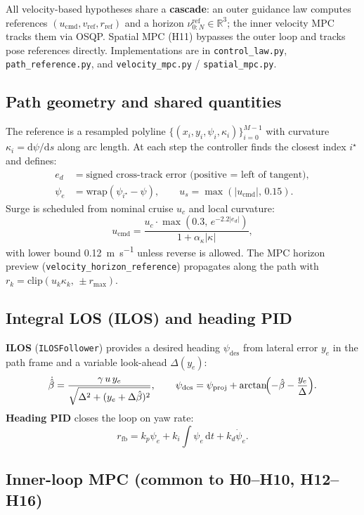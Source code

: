 \documentclass[11pt,a4paper]{article}
\begin{document}
All velocity-based hypotheses share a \textbf{cascade}: an outer guidance law computes
references $(u_{\mathrm{cmd}}, v_{\mathrm{ref}}, r_{\mathrm{ref}})$ and a horizon
$\nu^{\mathrm{ref}}_{0:N} \in \mathbb{R}^{3}$; the inner velocity MPC tracks them via OSQP.
Spatial MPC (H11) bypasses the outer loop and tracks pose references directly.
Implementations are in \texttt{control\_law.py}, \texttt{path\_reference.py}, and
\texttt{velocity\_mpc.py} / \texttt{spatial\_mpc.py}.

\subsection{Path geometry and shared quantities}

The reference is a resampled polyline $\{(x_i,y_i,\psi_i,\kappa_i)\}_{i=0}^{M-1}$ with
curvature $\kappa_i = \mathrm{d}\psi/\mathrm{d}s$ along arc length.
At each step the controller finds the closest index $i^\star$ and defines:
\begin{align}
  e_d &= \text{signed cross-track error (positive = left of tangent)}, \\
  \psi_e &= \mathrm{wrap}(\psi_{i^\star} - \psi), \qquad
  u_s = \max(|u_{\mathrm{cmd}}|,\, 0.15).
\end{align}
Surge is scheduled from nominal cruise $u_c$ and local curvature:
\[
  u_{\mathrm{cmd}} = \frac{u_c \cdot \max(0.3,\, e^{-2.2|e_d|})}
                         {1 + \alpha_\kappa |\kappa|},
\]
with lower bound \SI{0.12}{\meter\per\second} unless reverse is allowed.
The MPC horizon preview (\texttt{velocity\_horizon\_reference}) propagates along the path with
$r_k = \mathrm{clip}(u_k \kappa_k,\, \pm r_{\max})$.

\subsection{Integral LOS (ILOS) and heading PID}

\textbf{ILOS} (\texttt{ILOSFollower}) provides a desired heading $\psi_{\mathrm{des}}$ from
lateral error $y_e$ in the path frame and a variable look-ahead $\Delta(y_e)$:
\[
  \dot{\hat\beta} = \frac{\gamma\, u\, y_e}{\sqrt{\Delta^2 + (y_e + \Delta\hat\beta)^2}},
  \qquad
  \psi_{\mathrm{des}} = \psi_{\mathrm{proj}} + \arctan\!\Bigl(-\hat\beta - \frac{y_e}{\Delta}\Bigr).
\]
\textbf{Heading PID} closes the loop on yaw rate:
\[
  r_{\mathrm{fb}} = k_p \psi_e + k_i \!\int\! \psi_e\,\mathrm{d}t + k_d \dot\psi_e.
\]

\subsection{Inner-loop MPC (common to H0--H10, H12--H16)}
\end{document}
